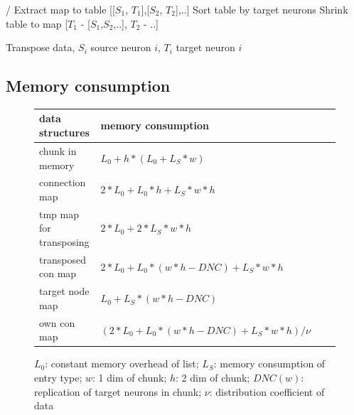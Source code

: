 \documentclass[a4paper]{article}
\begin{document}
\begin{algorithm}/
	Extract map to table [[$S_1$, $T_1$],[$S_2$, $T_2$],..]\;
	Sort table by target neurons\;
	Shrink table to map [$T_1$ - [$S_1$,$S_2$,..], $T_2$ - ..]\;		
\label{transdata}
\caption{Transpose data, $S_i$ source neuron $i$, $T_i$ target neuron $i$}
\end{algorithm}

\subsection{Memory consumption}
\begin{figure}[h]
\begin{tabular}{| l | l | l | l |}
    \hline
    data structures & memory consumption \\ \hline
    chunk in memory & $L_0 + h*(L_0 + L_S*w)$ \\ \hline
    connection map & $2*L_0+L_0*h+L_S*w*h$ \\ \hline
    tmp map for transposing & $2*L_0+2*L_S*w*h$ \\ \hline
    transposed con map & $2*L_0+L_0*(w*h-DNC)+L_S*w*h$ \\ \hline
    target node map & $L_0 + L_S*(w*h-DNC)$ \\ \hline
    own con map & $(2*L_0+L_0*(w*h-DNC)+L_S*w*h)/\nu$ \\ \hline
    \end{tabular}
\caption{$L_0$: constant memory overhead of list; $L_S$: memory consumption of entry type; $w$: 1 dim of chunk; $h$: 2 dim of chunk; $DNC(w)$: replication of target neurons in chunk; $\nu$: distribution coefficient of data}
\end{figure}	
\end{document}
